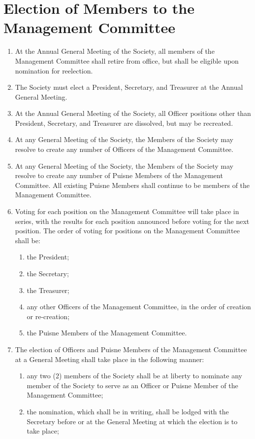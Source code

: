 \documentclass[a4paper]{article}
\newcommand*{\sectionr}[1]{{\raggedright \section{#1}}}
\begin{document}
\sectionr{Election of Members to the Management Committee}
\begin{enumerate}
\item At the Annual General Meeting of the Society, all members of the Management Committee shall retire from office, but shall be eligible upon nomination for re\textendash election.
\item The Society must elect a President, Secretary, and Treasurer at the Annual General Meeting.
\item At the Annual General Meeting of the Society, all Officer positions other than President, Secretary, and Treasurer are dissolved, but may be re\textendash created.
\item At any General Meeting of the Society, the Members of the Society may resolve to create any number of Officers of the Management Committee.
\item At any General Meeting of the Society, the Members of the Society may resolve to create any number of Puisne Members of the Management Committee. All existing Puisne Members shall continue to be members of the Management Committee.
\item Voting for each position on the Management Committee will take place in series, with the results for each position announced before voting for the next position. The order of voting for positions on the Management Committee shall be:
	\begin{enumerate}
	\item the President;
	\item the Secretary;
	\item the Treasurer;
	\item any other Officers of the Management Committee, in the order of creation or re-creation;
	\item the Puisne Members of the Management Committee.
	\end{enumerate}
\item The election of Officers and Puisne Members of the Management Committee at a General Meeting shall take place in the following manner:
	\begin{enumerate}
	\item any two (2) members of the Society shall be at liberty to nominate any member of the Society to serve as an Officer or Puisne Member of the Management Committee;
	\item the nomination, which shall be in writing, shall be lodged with the Secretary before or at the General Meeting at which the election is to take place;

\end{enumerate}
\end{enumerate}
\end{document}
